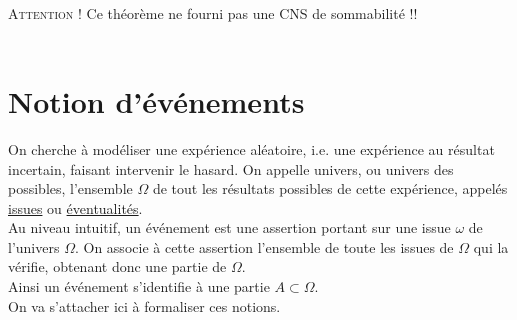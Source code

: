 		\\ \textsc{Attention !} Ce théorème ne fourni pas une CNS de sommabilité !!
		\vspace*{0.5cm} \\ 
		\vspace*{0.5cm} \\ 
	\section{Notion d'événements}
		On cherche à modéliser une expérience aléatoire, i.e. une expérience au résultat incertain, faisant intervenir le hasard. On appelle univers, ou univers des possibles, l'ensemble $\Omega$ de tout les résultats possibles de cette expérience, appelés \uline{issues} ou \uline{éventualités}.\vspace*{0.2cm} \\
		\hspace*{0.65cm}Au niveau intuitif, un événement est une assertion portant sur une issue $\omega$ de l'univers $\Omega$. On associe à cette assertion l'ensemble de toute les issues de $\Omega$ qui la vérifie, obtenant donc une partie de $\Omega$.\\
		\hspace*{0.65cm}Ainsi un événement s'identifie à une partie $A\subset\Omega$. \vspace*{0.2cm} \\ 
		\hspace*{0.65cm}On va s'attacher ici à formaliser ces notions. \\ \traitd
